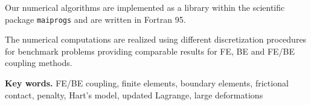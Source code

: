Our numerical algorithms are implemented as a library within the scientific package \texttt{maiprogs} and are written in Fortran 95.

The numerical computations are realized using different discretization procedures for benchmark problems   providing comparable results for FE, BE and FE/BE coupling methods.






\textbf{Key words.} FE/BE coupling,  finite elements, boundary elements, frictional contact, penalty, Hart's model, updated Lagrange, large deformations